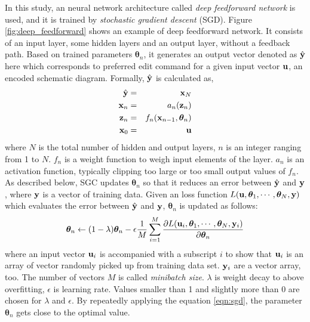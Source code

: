\documentclass[twocolumn]{article}
\begin{document}
In this study, an neural network architecture called
{\it deep feedforward network} is used,
and it is trained by {\it stochastic gradient descent} (SGD)\cite{mit}.
Figure \ref{fig:deep_feedforward} shows an example of deep feedforward network.
It consists of an input layer, some hidden layers and an output layer,
without a feedback path.
Based on trained parameters ${\bm \theta}_n$,
it generates an output vector denoted as $\hat{\bf y}$ here
which corresponds to preferred edit command for a given input vector
${\bf u}$, an encoded schematic diagram.
Formally, $\hat{\bf y}$ is calculated as,
\begin{eqnarray}
\hat{\bf y} &=& {\bf x}_N \\
{\bf x}_n &=& a_n({\bf z}_n) \\
{\bf z}_n &=& f_n({\bf x}_{n-1}, {\bm \theta}_n)\\
{\bf x}_0 &=& {\bf u}
\end{eqnarray}
where $N$ is the total number of hidden and output layers,
$n$ is an integer ranging from 1 to $N$.
$f_n$ is a weight function to weigh input elements of the layer.
$a_n$ is an activation function,
typically clipping too large or too small output values of $f_n$.
As described below,
SGC updates ${\bm \theta}_n$ so that it reduces an error
between $\hat{\bf y}$ and ${\bf y}$,
where ${\bf y}$ is a vector of training data.
Given an loss function
$L({\bf u},{\bm \theta}_1,\cdots,{\bm \theta}_N,{\bf y})$
which evaluates the error between $\hat{\bf y}$ and ${\bf y}$,
${\bm \theta}_n$ is updated as follows:
\begin{eqnarray}
{\bm \theta}_n \leftarrow
(1-\lambda){\bm \theta}_n
- \epsilon
  \frac{1}{M}\sum_{i=1}^M
  \frac{\partial L({\bf u}_i,{\bm \theta}_1,\cdots,{\bm \theta}_N,{\bf y}_i)}
       {\partial {\bm \theta}_n}\label{eqn:sgd}
\end{eqnarray}
where an input vector ${\bf u}_i$ is accompanied with a subscript $i$
to show that ${\bf u}_i$ is an array of vector randomly picked up
from training data set.
${\bf y}_i$ are a vector array, too.
The number of vectors $M$ is called {\it minibatch size}.
$\lambda$ is weight decay to above overfitting,
$\epsilon$ is learning rate.
Values smaller than 1 and slightly more than 0 are chosen
for $\lambda$ and $\epsilon$.
By repeatedly applying the equation \ref{eqn:sgd},
the parameter ${\bm \theta}_n$ gets close to the optimal value.
\end{document}
